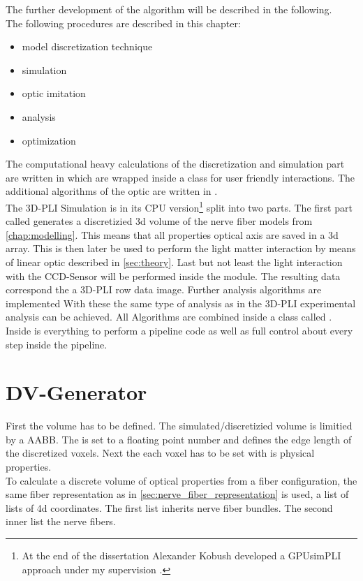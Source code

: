 %
The further development of the algorithm will be described in the following.
\\[\baselineskip]
% 
The following procedures are described in this chapter:
\begin{itemize}[nosep]
    \item model discretization technique
    \item simulation
    \item optic imitation 
    \item analysis
    \item optimization
\end{itemize}
% 
The computational heavy calculations of the discretization and simulation part are written in \cpp{} which are wrapped inside a \python class  for user friendly interactions.
The additional algorithms of the optic are written in .
% 
\\[\baselineskip]
% 
The \ac{3D-PLI} Simulation is in its \ac{CPU} version\footnote{At the end of the dissertation Alexander Kobush developed a GPUsimPLI approach under my supervision \cite{}.} split into two parts.
The first part called   generates a discretizied 3d volume of the nerve fiber models from \cref{chap:modelling}.
This means that all properties \eg{} optical axis are saved in a 3d array.
This  is then later be used to perform the light matter interaction by means of linear optic described in \cref{sec:theory}.
Last but not least the light interaction with the \ac{CCD}-Sensor will be performed inside the  module.
The resulting data correspond the a \ac{3D-PLI} row data image.
Further analysis algorithms are implemented
With these the same type of analysis as in the \ac{3D-PLI} experimental analysis can be achieved.
All Algorithms are combined inside a \python{} class called .
Inside is everything to perform a pipeline code as well as full control about every step inside the pipeline.
% 
\section{DV-Generator}
\label{sec:dv_generator}
% 
First the volume has to be defined.
The simulated/discretizied volume is limitied by a \ac{AABB}.
The  is set to a floating point number and defines the edge length of the discretized voxels.
Next the each voxel has to be set with is physical properties.
\\
% 
To calculate a discrete volume of optical properties from a fiber configuration, the same fiber representation as in \cref{sec:nerve_fiber_representation} is used, \ie{} a list of lists of 4d coordinates.
The first list inherits nerve fiber bundles.
The second inner list the nerve fibers.

